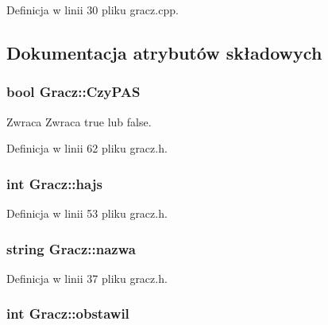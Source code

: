 Definicja w linii 30 pliku gracz.\-cpp.



\subsection{Dokumentacja atrybutów składowych}
\hypertarget{class_gracz_a21194ebb17e901c39c9c83e699a9e2b7}{
\subsubsection[{Czy\-P\-A\-S}]{\setlength{\rightskip}{0pt plus 5cm}bool Gracz\-::\-Czy\-P\-A\-S}}\label{class_gracz_a21194ebb17e901c39c9c83e699a9e2b7}
\begin{DoxyReturn}{Zwraca}
Zwraca true lub false. 
\end{DoxyReturn}


Definicja w linii 62 pliku gracz.\-h.

\hypertarget{class_gracz_af1bf45c98144c1018c653284d54638a1}{
\subsubsection[{hajs}]{\setlength{\rightskip}{0pt plus 5cm}int Gracz\-::hajs}}\label{class_gracz_af1bf45c98144c1018c653284d54638a1}


Definicja w linii 53 pliku gracz.\-h.

\hypertarget{class_gracz_a4b6cb4abfba854a45d71fe50dea46f81}{
\subsubsection[{nazwa}]{\setlength{\rightskip}{0pt plus 5cm}string Gracz\-::nazwa}}\label{class_gracz_a4b6cb4abfba854a45d71fe50dea46f81}


Definicja w linii 37 pliku gracz.\-h.

\hypertarget{class_gracz_a05bccdfde37c1d458fced24cd6242528}{
\subsubsection[{obstawil}]{\setlength{\rightskip}{0pt plus 5cm}int Gracz\-::obstawil}}\label{class_gracz_a05bccdfde37c1d458fced24cd6242528}


